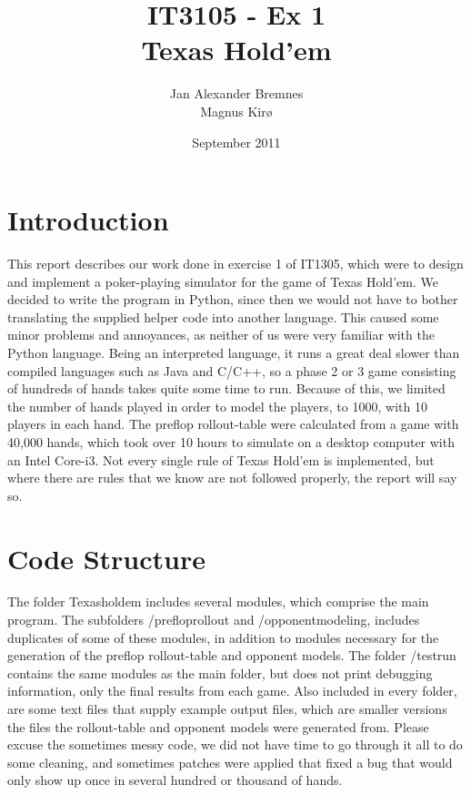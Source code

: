 \documentclass[titlepage]{article}
\author{Jan Alexander Bremnes\\Magnus Kirø}
\title{IT3105 - Ex 1\\Texas Hold'em}
\date{September 2011}
\begin{document}
    \maketitle
    \tableofcontents
    \newpage

\section{Introduction}
	This report describes our work done in exercise 1 of IT1305, which were to design and implement a poker-playing simulator for the game of Texas Hold'em. We decided to write the program in Python, since then we would not have to bother translating the supplied helper code into another language. This caused some minor problems and annoyances, as neither of us were very familiar with the Python language. Being an interpreted language, it runs a great deal slower than compiled languages such as Java and C/C++, so a phase 2 or 3 game consisting of hundreds of hands takes quite some time to run. Because of this, we limited the number of hands played in order to model the players, to 1000, with 10 players in each hand. The preflop rollout-table were calculated from a game with 40,000 hands, which took over 10 hours to simulate on a desktop computer with an Intel Core-i3. Not every single rule of Texas Hold'em is implemented, but where there are rules that we know are not followed properly, the report will say so. 
	
\section{Code Structure}
    The folder Texasholdem includes several modules, which comprise the main program. The subfolders /prefloprollout and /opponentmodeling, includes duplicates of some of these modules, in addition to modules necessary for the generation of the preflop rollout-table and opponent models. The folder /testrun contains the same modules as the main folder, but does not print debugging information, only the final results from each game. Also included in every folder, are some text files that supply example output files, which are smaller versions the files the rollout-table and opponent models were generated from. Please excuse the sometimes messy code, we did not have time to go through it all to do some cleaning, and sometimes patches were applied that fixed a bug that would only show up once in several hundred or thousand of hands.
\end{document}
